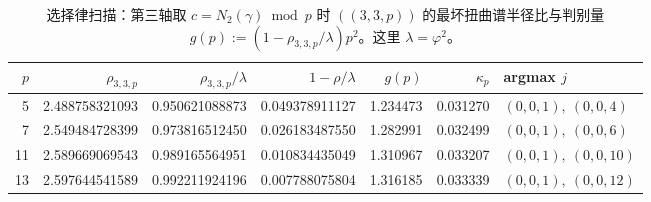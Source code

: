 \begin{table}[H]
\centering
\scriptsize
\setlength{\tabcolsep}{6pt}
\caption{选择律扫描：第三轴取 $c=N_2(\gamma)\bmod p$ 时 $((3,3,p))$ 的最坏扭曲谱半径比与判别量 $g(p):=(1-\rho_{3,3,p}/\lambda)p^2$。这里 $\lambda=\varphi^2$。}
\label{tab:real_input_40_arity_335_n2_selection_law_primes}
\begin{tabular}{r r r r r r l}
\toprule
$p$ & $\rho_{3,3,p}$ & $\rho_{3,3,p}/\lambda$ & $1-\rho/\lambda$ & $g(p)$ & $\kappa_p$ & argmax $j$\\
\midrule
5 & 2.488758321093 & 0.950621088873 & 0.049378911127 & 1.234473 & 0.031270 & $(0,0,1),\ (0,0,4)$\\
7 & 2.549484728399 & 0.973816512450 & 0.026183487550 & 1.282991 & 0.032499 & $(0,0,1),\ (0,0,6)$\\
11 & 2.589669069543 & 0.989165564951 & 0.010834435049 & 1.310967 & 0.033207 & $(0,0,1),\ (0,0,10)$\\
13 & 2.597644541589 & 0.992211924196 & 0.007788075804 & 1.316185 & 0.033339 & $(0,0,1),\ (0,0,12)$\\
\bottomrule
\end{tabular}
\end{table}
